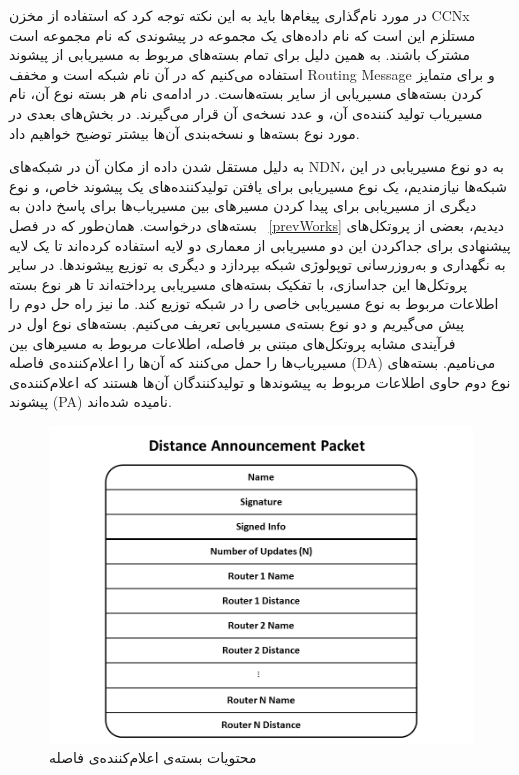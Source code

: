در مورد نام‌گذاری پیغام‌ها باید به این نکته توجه کرد که استفاده از مخزن CCNx مستلزم این است که نام داده‌های یک مجموعه در پیشوندی که نام مجموعه است مشترک باشند. به همین دلیل برای تمام بسته‌های مربوط به مسیریابی از پیشوند  استفاده می‌کنیم که در آن  نام شبکه است و  مخفف Routing Message و برای متمایز کردن بسته‌های مسیریابی از سایر بسته‌هاست. در ادامه‌ی نام هر بسته نوع آن، نام مسیریاب تولید کننده‌ی آن، و عدد نسخه‌ی آن قرار می‌گیرند. در بخش‌های بعدی در مورد نوع بسته‌ها و نسخه‌بندی آن‌ها بیشتر توضیح خواهیم داد.


به دلیل مستقل شدن داده از مکان آن در شبکه‌های NDN، به دو نوع مسیریابی در این شبکه‌ها نیازمندیم، یک نوع مسیریابی برای یافتن تولید‌کننده‌های یک پیشوند خاص، و نوع دیگری از مسیریابی برای پیدا کردن مسیرهای بین مسیریاب‌ها برای پاسخ دادن به بسته‌های درخواست. همان‌طور که در فصل  ~\ref{prevWorks} دیدیم، بعضی از پروتکل‌های پیشنهادی برای جداکردن این دو مسیریابی از معماری دو لایه استفاده کرده‌اند تا یک لایه به نگهداری و به‌روزرسانی توپولوژی شبکه بپردازد و دیگری به توزیع پیشوند‌ها. در سایر پروتکل‌ها این جداسازی، با تفکیک بسته‌های مسیریابی پرداخته‌اند تا هر نوع بسته اطلاعات مربوط به نوع مسیریابی خاصی را در شبکه توزیع کند. ما نیز راه حل دوم را پیش می‌گیریم و دو نوع بسته‌ی مسیریابی تعریف می‌کنیم. بسته‌های نوع اول در فرآیندی مشابه پروتکل‌های مبتنی بر فاصله، اطلاعات مربوط به مسیرهای بین مسیریاب‌ها را حمل می‌کنند که آن‌ها را اعلام‌کننده‌ی فاصله (DA) می‌نامیم. بسته‌های نوع دوم حاوی اطلاعات مربوط به پیشوند‌ها و تولید‌کنندگان آن‌ها هستند که اعلام‌کننده‌ی پیشوند (PA) نامیده شده‌اند. 
\begin{figure}[hb!]
\centering
\includegraphics[scale=0.6]{./resources/figures/DA.png}
\caption{محتویات بسته‌ی اعلام‌کننده‌ی فاصله}
\label{fig:DA}
\end{figure}

